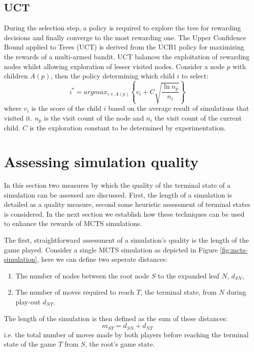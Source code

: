 \documentclass{ecai2010}
\begin{document}
\subsection{UCT}
\label{subsec:uct}
During the selection step, a policy is required to explore the tree for rewarding decisions and finally converge to the most rewarding one. The Upper Confidence Bound applied to Trees (UCT) \cite{kocsis2006bandit} is derived from the UCB1 policy \cite{auer2002using} for maximizing the rewards of a multi-armed bandit. UCT balances the exploitation of rewarding nodes whilst allowing exploration of lesser visited nodes. Consider a node $p$ with children $A(p)$, then the policy determining which child $i$ to select:
\begin{equation}
\label{eq:uct}
i^* = argmax_{i \in A(p)}\left\{ v_i + C \sqrt{ \frac{\ln{n_p}}{n_i}}\right\}
\end{equation}
where $v_i$ is the score of the child $i$ based on the average result of simulations that visited it. $n_p$ is the visit count of the node and $n_i$ the visit count of the current child. $C$ is the exploration constant to be determined by experimentation.

\section{Assessing simulation quality}
\label{sec:poqual}

In this section two measures by which the quality of the terminal state of a simulation can be assessed are discussed. First, the length of a simulation is detailed as a quality measure, second some heuristic assessment of terminal states is considered. In the next section we establish how these techniques can be used to enhance the rewards of MCTS simulations.

The first, straightforward assessment of a simulation's quality is the length of the game played. Consider a single MCTS simulation as depicted in Figure \ref{fig:mcts-simulation}, here we can define two seperate distances: 
\begin{enumerate}
\item The number of nodes between the root node $S$ to the expanded leaf $N$, $d_{SN}$,
\item The number of moves required to reach $T$, the terminal state, from $N$ during play-out $d_{NT}$.
\end{enumerate}
The length of the simulation is then defined as the sum of these distances:
\begin{equation}
m_{ST} = d_{SN} + d_{NT}
\label{eq:m_ST}
\end{equation}
i.e. the total number of moves made by both players before reaching the terminal state of the game $T$ from $S$, the root's game state.
\end{document}
